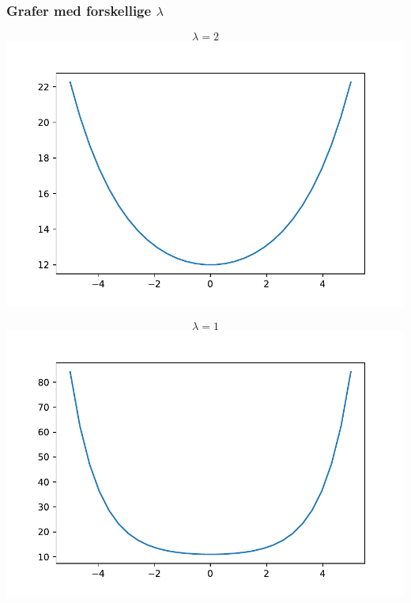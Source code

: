\begin{frame}
\frametitle{Grafer med forskellige $\lambda$}
\begin{minipage}[t]{0.49\textwidth}
$$\lambda=2$$
\includegraphics[scale=0.3]{img/fig3}
\end{minipage}
\begin{minipage}[t]{0.49\textwidth}
$$\lambda=1$$
\includegraphics[scale=0.3]{img/fig4}
\end{minipage}
%
\end{frame}



